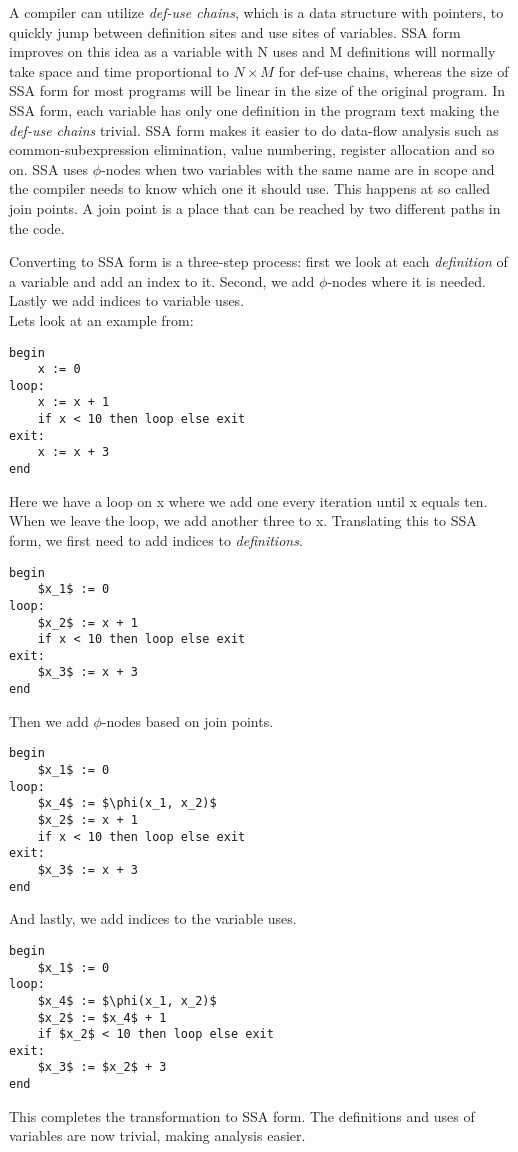 A compiler can utilize \emph{def-use chains}, which is a data structure with pointers, to quickly jump between definition sites and use sites of variables.
SSA form improves on this idea as a variable with N uses and M definitions will normally take space and time proportional to $N \times M$ for def-use chains, whereas the size of SSA form for most programs will be linear in the size of the original program.
In SSA form, each variable has only one definition in the program text making the \emph{def-use chains} trivial.
SSA form makes it easier to do data-flow analysis such as common-subexpression elimination, value numbering, register allocation and so on.
SSA uses $\phi$-nodes when two variables with the same name are in scope and the compiler needs to know which one it should use. This happens at so called join points. A join point is a place that can be reached by two different paths in the code.

Converting to SSA form is a three-step process: first we look at each \emph{definition} of a variable and add an index to it. Second, we add $\phi$-nodes where it is needed. Lastly we add indices to variable uses. \\
Lets look at an example from\cite{10.1007/978-3-319-41579-6_16}:
\begin{lstlisting}
begin
    x := 0
loop:
    x := x + 1
    if x < 10 then loop else exit
exit:
    x := x + 3
end
\end{lstlisting}
Here we have a loop on x where we add one every iteration until x equals ten. When we leave the loop, we add another three to x.
Translating this to SSA form, we first need to add indices to \emph{definitions}.
\begin{lstlisting}[mathescape=true]
begin
    $x_1$ := 0
loop:
    $x_2$ := x + 1
    if x < 10 then loop else exit
exit:
    $x_3$ := x + 3
end
\end{lstlisting}
Then we add $\phi$-nodes based on join points.
\begin{lstlisting}[mathescape=true]
begin
    $x_1$ := 0
loop:
    $x_4$ := $\phi(x_1, x_2)$
    $x_2$ := x + 1
    if x < 10 then loop else exit
exit:
    $x_3$ := x + 3
end
\end{lstlisting}
And lastly, we add indices to the variable uses.
\begin{lstlisting}[mathescape=true]
begin
    $x_1$ := 0
loop:
    $x_4$ := $\phi(x_1, x_2)$
    $x_2$ := $x_4$ + 1
    if $x_2$ < 10 then loop else exit
exit:
    $x_3$ := $x_2$ + 3
end
\end{lstlisting}
This completes the transformation to SSA form. The definitions and uses of variables are now trivial, making analysis easier.

